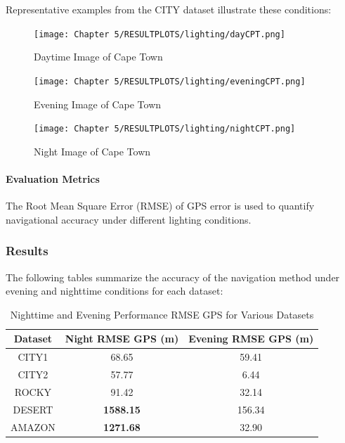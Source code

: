 Representative examples from the CITY dataset illustrate these conditions:

\begin{figure}[H]
    \centering
    \texttt{[image: Chapter 5/RESULTPLOTS/lighting/dayCPT.png]}
    \caption{Daytime Image of Cape Town}
    \label{fig:Day_CPT}
\end{figure}

\begin{figure}[H]
    \centering
    \texttt{[image: Chapter 5/RESULTPLOTS/lighting/eveningCPT.png]}
    \caption{Evening Image of Cape Town}
    \label{fig:Evening_CPT}
\end{figure}

\begin{figure}[H]
    \centering
    \texttt{[image: Chapter 5/RESULTPLOTS/lighting/nightCPT.png]}
    \caption{Night Image of Cape Town}
    \label{fig:Night_CPT}
\end{figure}

\paragraph{Evaluation Metrics}
The Root Mean Square Error (RMSE) of GPS error is used to quantify navigational accuracy under different lighting conditions.

\subsubsection{Results}

The following tables summarize the accuracy of the navigation method under evening and nighttime conditions for each dataset: 

\begin{table}[H]
    \centering
    \caption{Nighttime and Evening Performance RMSE GPS for Various Datasets}
    \label{tab:performance}
    \begin{tabular}{|c|c|c|}
    \hline
    \textbf{Dataset} & \textbf{Night RMSE GPS (m)} & \textbf{Evening RMSE GPS (m)} \\ \hline
    CITY1   & 68.65      & 59.41      \\ \hline
    CITY2   & 57.77      & 6.44       \\ \hline
    ROCKY   & 91.42      & 32.14      \\ \hline
    DESERT  & \textbf{1588.15} & 156.34     \\ \hline
    AMAZON  & \textbf{1271.68} & 32.90      \\ \hline
    \end{tabular}
    \end{table}
    

